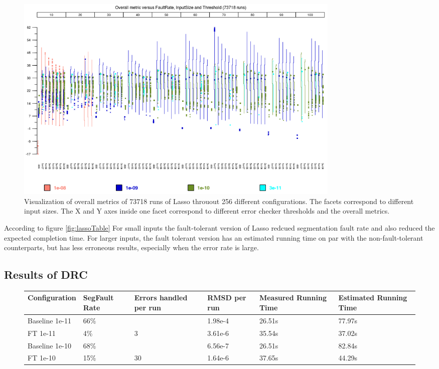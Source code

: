 \documentclass{article}
\begin{document}
\begin{figure}[h!]
\begin{center}
\includegraphics[width=16cm,natwidth=1156,natheight=725]{OverallMetric_Lasso_Boxplot.png}
\end{center}
\caption{Visualization of overall metrics of 73718 runs of Lasso throuout 256 different configurations. The facets correspond to different input sizes. The X and Y axes inside one facet correspond to different error checker thresholds and the overall metrics.}
\end{figure}

According to figure \ref{fig:lassoTable} For small inputs the fault-tolerant version of Lasso redcued segmentation fault rate and also reduced the expected completion time. For larger inputs, the fault tolerant version has an estimated running time on par with the non-fault-tolerant counterparts, but has less erroneous results, especially when the error rate is large.

\subsection{Results of DRC}

\begin{figure}[h!]
 \begin{center} \begin{tabular}{p{2.5cm}p{2cm}p{2cm}p{2.5cm}p{2.5cm}p{2.5cm}}

\hline
Configuration & SegFault Rate & Errors handled per run & RMSD per run & Measured Running Time & Estimated Running Time\\
\hline
Baseline 1e-11 & 66\% &         & 1.98e-4 & 26.51s & 77.97s \\
FT 1e-11       & 4\%  & 3       & 3.61e-6 & 35.54s & 37.02s \\
Baseline 1e-10 & 68\% &         & 6.56e-7 & 26.51s & 82.84s \\
FT 1e-10       & 15\% & 30      & 1.64e-6 & 37.65s & 44.29s \\
\hline
\end{tabular} 
\end{center} 

\end{figure}
\end{document}
